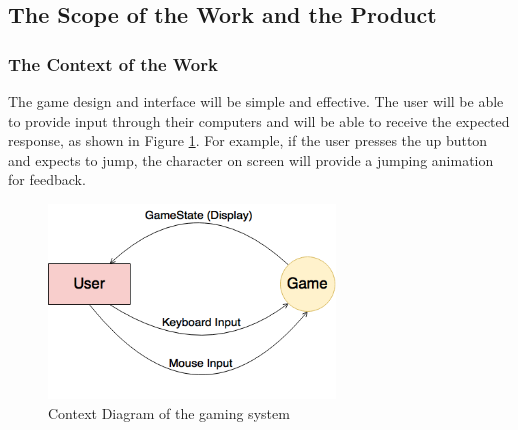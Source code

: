 \documentclass[12pt, titlepage]{article}
\begin{document}
\subsection{The Scope of the Work and the Product}

\subsubsection{The Context of the Work}
The game design and interface will be simple and effective. The user will be able to provide input through their computers and will be able to receive the expected response, as shown in Figure \ref{fig:context}. For example, if the user presses the up button and expects to jump, the character on screen will provide a jumping animation for feedback.
\begin{figure}[h] %
   \centering
   \includegraphics[width=3in]{Fig1} 
   \caption{Context Diagram of the gaming system}
   \label{fig:context}
\end{figure}
\end{document}
